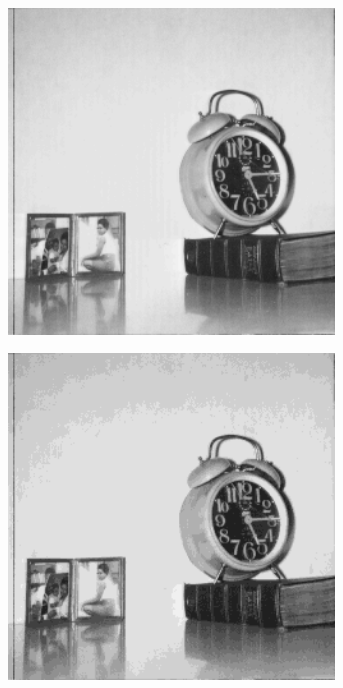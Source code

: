 \begin{figure}
\begin{subfigure}[b]{.23\textwidth}
  \caption{}
  \label{fig:test-images-clock-truncate1}
\end{subfigure}
\begin{subfigure}[b]{.23\textwidth}
  \centering
  \includegraphics[width=0.95\textwidth]{figures/test-images/truncate2/clock}
  \caption{}
  \label{fig:test-images-clock-truncate2}
\end{subfigure}
\begin{subfigure}[b]{.23\textwidth}
  \centering
  \includegraphics[width=0.95\textwidth]{figures/test-images/truncate4/clock}
  \caption{}
  \label{fig:test-images-clock-truncate4}
\end{subfigure}


\end{figure}
